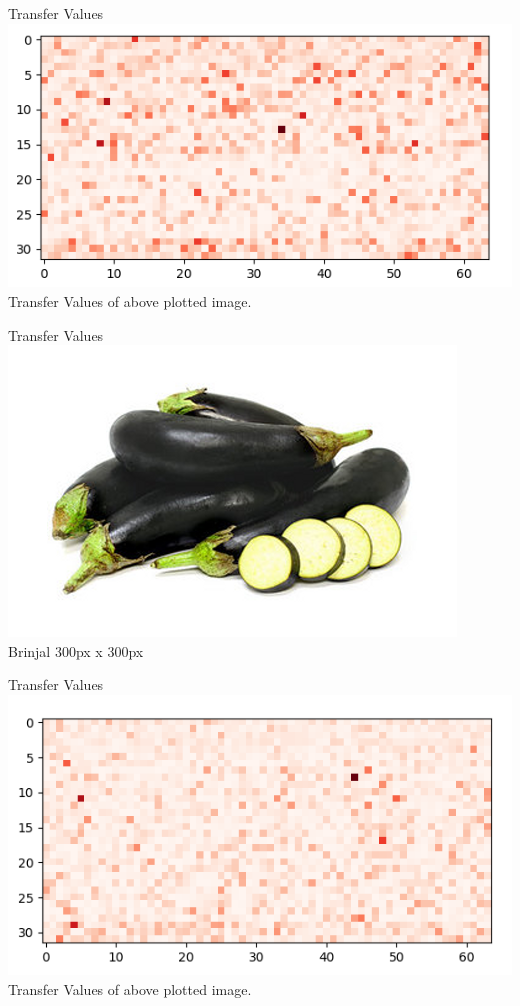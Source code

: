 \documentclass[10pt, a4paper,xcolor=table]{beamer}
\begin{document}
\begin{frame}{Transfer Values}
	\includegraphics[scale=0.5]{brinjaltransfer1.png} \\
	\centering
	Transfer Values of above plotted image.
\end{frame}


\begin{frame}{Transfer Values}
	\includegraphics[scale=0.6]{brinjal2.png} \\
	\centering
	Brinjal 300px x 300px
\end{frame}


\begin{frame}{Transfer Values}
	\includegraphics[scale=0.5]{brinjal2transfer.png} \\
	\centering
	Transfer Values of above plotted image.
\end{frame}
\end{document}
